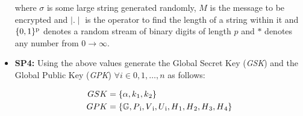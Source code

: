 \documentclass[conference]{IEEEtran}
\begin{document}
\begin{itemize}
          where $\sigma$ is some large string generated randomly, $M$ is the message to be encrypted and $\mid . \mid$ is the operator to find the length of a string within it and $\{0,1\}\textsuperscript{p}$ denotes a random stream of binary digits of length $p$ and $*$ denotes any number from $0 \longrightarrow \infty $.
    \item{\textbf{SP4:}} Using the above values generate the Global Secret Key (\emph{GSK}) and the Global Public Key (\emph{GPK}) $ \forall i \in 0,1,\ldots , n$ as follows:
          \begin{ceqn}
              \begin{align}
                  GSK & = \{ \alpha, k\textsubscript{1},k\textsubscript{2}\}\\
                  GPK & = \{ \mathbb{G}, P\textsubscript{i}, V\textsubscript{i}, U\textsubscript{i}, H\textsubscript{1}, H\textsubscript{2}, H\textsubscript{3}, H\textsubscript{4} \}
              \end{align}
          \end{ceqn}
\end{itemize}
\end{document}
